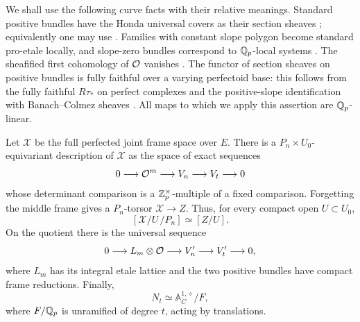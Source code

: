 We shall use the following curve facts with their relative meanings.
Standard positive bundles have the Honda universal covers as their
section sheaves
\cite[Corollary~5.1.2 and Proposition~5.1.6]{ScholzeWeinstein};
equivalently one may use
\cite[Theorems~15.2.3 and~15.2.5]{ScholzeWeinsteinBerkeley}.
Families with constant slope polygon become standard pro-etale locally,
and slope-zero bundles correspond to $\mathbb Q_p$-local systems
\cite[Theorem~II.2.19 and Corollary~II.2.20]{FarguesScholze}.
The sheafified first cohomology of $\mathcal O$ vanishes
\cite[Proposition~II.2.5(ii)]{FarguesScholze}.
The functor of section sheaves on positive bundles is fully faithful
over a varying perfectoid base: this follows from the fully faithful
$R\tau_*$ on perfect complexes and the positive-slope identification
with Banach--Colmez sheaves
\cite[Corollary~3.11]{AnschuetzLeBrasFourier}.
All maps to which we apply this assertion are $\mathbb Q_p$-linear.

\begin{theorem}\label{thm:geometric-quotient}
Let $\mathcal X$ be the full perfected joint frame space over $E$.
There is a $P_n\times U_0$-equivariant description of $\mathcal X$ as
the space of exact sequences
\begin{equation}\label{support:framed-extension}
 0\longrightarrow\mathcal O^m\longrightarrow V_n
 \longrightarrow V_t\longrightarrow0
\end{equation}
whose determinant comparison is a $\mathbb Z_p^\times$-multiple of a fixed
comparison.  Forgetting the middle frame gives a $P_n$-torsor
$\mathcal X\to Z$.  Thus, for every compact open $U\subset U_0$,
\begin{equation}\label{support:quotient-stacks}
 [\mathcal X/U\,/P_n]\simeq[Z/U].
\end{equation}
On the quotient there is the universal sequence
\[
 0\longrightarrow L_m\otimes\mathcal O\longrightarrow V_n'
 \longrightarrow V_t'\longrightarrow0,
\]
where $L_m$ has its integral etale lattice and the two positive bundles
have compact frame reductions.  Finally,
\begin{equation}\label{support:additive-presentation}
 N_t\simeq\mathbb A_C^{1,\diamond}/F,
\end{equation}
where $F/\mathbb Q_p$ is unramified of degree $t$, acting by translations.
\end{theorem}

